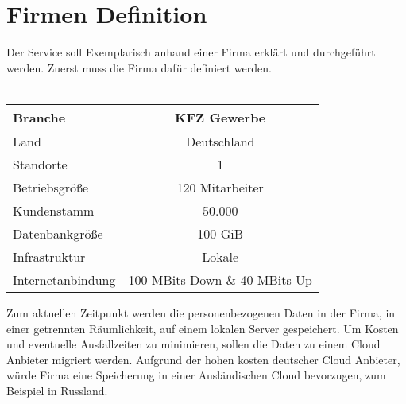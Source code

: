 \section{Firmen Definition}
Der Service soll Exemplarisch anhand einer Firma erklärt und durchgeführt werden. Zuerst muss die Firma dafür definiert werden.\\\\

\begin{table}[h!]
\centering
\begin{tabular}{l|c}
Branche           & KFZ Gewerbe                   \\ \hline
Land              & Deutschland                   \\ \hline
Standorte         & 1                             \\ \hline
Betriebsgröße     & 120 Mitarbeiter               \\ \hline
Kundenstamm       & 50.000                        \\ \hline
Datenbankgröße    & 100 GiB                       \\ \hline
Infrastruktur     & Lokale                        \\ \hline
Internetanbindung & 100 MBits Down \& 40 MBits Up
\end{tabular}
\end{table} 

Zum aktuellen Zeitpunkt werden die personenbezogenen Daten in der Firma, in einer getrennten Räumlichkeit, auf einem lokalen Server gespeichert. Um Kosten und eventuelle Ausfallzeiten zu minimieren, sollen die Daten zu einem Cloud Anbieter migriert werden. Aufgrund der hohen kosten deutscher Cloud Anbieter, würde Firma eine Speicherung in einer Ausländischen Cloud bevorzugen, zum Beispiel in Russland.